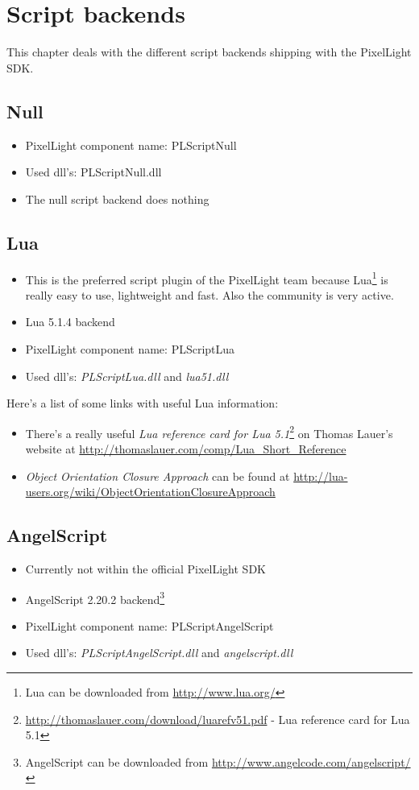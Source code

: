 \chapter{Script backends}
This chapter deals with the different script backends shipping with the PixelLight SDK.




\section{Null}
\begin{itemize}
\item PixelLight component name: PLScriptNull
\item Used dll's: PLScriptNull.dll
\item The null script backend does nothing
\end{itemize}




\section{Lua}
\begin{itemize}
\item This is the preferred script plugin of the PixelLight team because Lua\footnote{Lua can be downloaded from \url{http://www.lua.org/}} is really easy to use, lightweight and fast. Also the community is very active.
\item Lua 5.1.4 backend
\item PixelLight component name: PLScriptLua
\item Used dll's: \emph{PLScriptLua.dll} and \emph{lua51.dll}
\end{itemize}

Here's a list of some links with useful Lua information:
\begin{itemize}
\item There's a really useful \emph{Lua reference card for Lua 5.1}\footnote{\url{http://thomaslauer.com/download/luarefv51.pdf} - Lua reference card for Lua 5.1} on Thomas Lauer's website at \url{http://thomaslauer.com/comp/Lua_Short_Reference}
\item \emph{Object Orientation Closure Approach} can be found at \url{http://lua-users.org/wiki/ObjectOrientationClosureApproach}
\end{itemize}




\section{AngelScript}
\begin{itemize}
\item Currently not within the official PixelLight SDK
\item AngelScript 2.20.2 backend\footnote{AngelScript can be downloaded from \url{http://www.angelcode.com/angelscript/}}
\item PixelLight component name: PLScriptAngelScript
\item Used dll's: \emph{PLScriptAngelScript.dll} and \emph{angelscript.dll}
\end{itemize}

